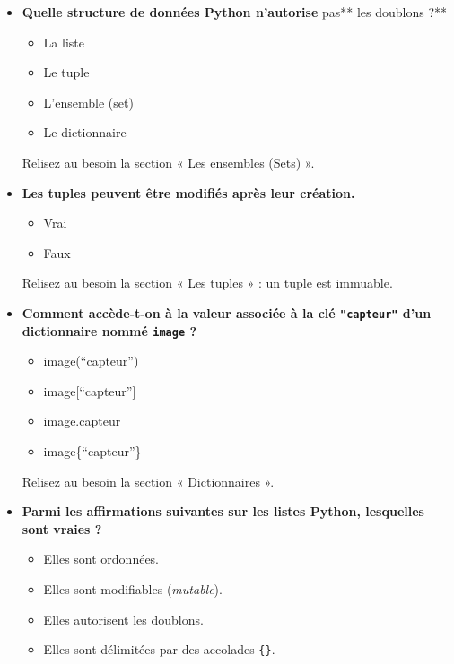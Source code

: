\documentclass[
  french,
  11pt,
  letterpaper,
  open=any,
  twoside=false,
  french]{scrbook}
\providecommand{\tightlist}{%
  \setlength{\itemsep}{0pt}\setlength{\parskip}{0pt}}
\begin{document}
\begin{itemize}
\item
  \textbf{Quelle structure de données Python n'autorise }pas** les
  doublons ?**

  \begin{itemize}
  \tightlist
  \item
    La liste
  \item
    Le tuple
  \item
    L'ensemble (set)
  \item
    Le dictionnaire
  \end{itemize}

  Relisez au besoin la section « Les ensembles (Sets) ».
\item
  \textbf{Les tuples peuvent être modifiés après leur création.}

  \begin{itemize}
  \tightlist
  \item
    Vrai
  \item
    Faux
  \end{itemize}

  Relisez au besoin la section « Les tuples » : un tuple est immuable.
\item
  \textbf{Comment accède-t-on à la valeur associée à la clé
  \texttt{"capteur"} d'un dictionnaire nommé \texttt{image} ?}

  \begin{itemize}
  \tightlist
  \item
    image(``capteur'')
  \item
    image{[}``capteur''{]}
  \item
    image.capteur
  \item
    image\{``capteur''\}
  \end{itemize}

  Relisez au besoin la section « Dictionnaires ».
\item
  \textbf{Parmi les affirmations suivantes sur les listes Python,
  lesquelles sont vraies ?}

  \begin{itemize}
  \tightlist
  \item
    Elles sont ordonnées.
  \item
    Elles sont modifiables (\emph{mutable}).
  \item
    Elles autorisent les doublons.
  \item
    Elles sont délimitées par des accolades \texttt{\{\}}.
  \end{itemize}


\end{itemize}
\end{document}

